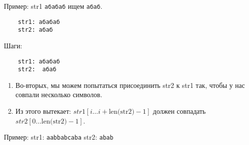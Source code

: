 Пример: \textsf{str1} \texttt{абабаб} ищем \texttt{абаб}.
\begin{verbatim}
	str1: абабаб
	str2: абаб
\end{verbatim}
Шаги:
\begin{verbatim}
	str1: абабаб
	str2:  абаб
\end{verbatim}

\begin{enumerate}
	\item Во-вторых, мы можем попытаться присоединить \textsf{str2} к \textsf{str1} так, чтобы у нас совпали несколько символов.
	\item Из этого вытекает: $str1[i \dots i+\text{len(str2)}-1]$ должен совпадать $str2[0 \dots \text{len(str2)}-1]$.
\end{enumerate}
Пример:
\textsf{str1}: \texttt{aabbabcaba}
\textsf{str2}: \texttt{abab}